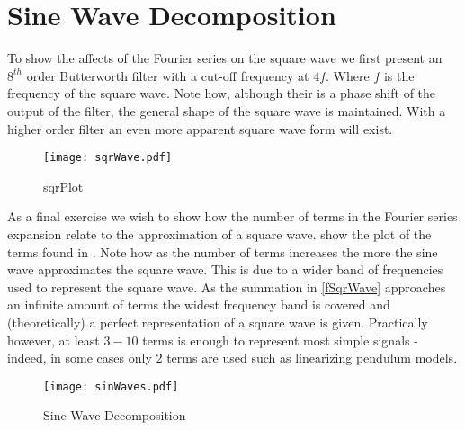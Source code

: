 \documentclass[main.tex]{subfile}
\begin{document}
\section{Sine Wave Decomposition} 
\label{sec:sections}

To show the affects of the Fourier series on the square wave we first present an
$8^{th}$ order Butterworth filter with a cut-off frequency at $4f$. Where $f$
is the frequency of the square wave. Note how, although their is a phase shift
of the output of the filter, the general shape of the square wave is maintained.
With a higher order filter an even more apparent square wave form will exist.

\begin{figure}[H]
    \begin{center}
      \texttt{[image: sqrWave.pdf]}
    \end{center}
    \caption{sqrPlot}
    \label{fig:sqrPlot}
  \end{figure}

As a final exercise we wish to show how the number of terms in the Fourier series
expansion relate to the approximation of a square wave.  show
the plot of the terms found in . Note how as the number of
terms increases the more the sine wave approximates the square wave. This is due
to a wider band of frequencies used to represent the square wave. As the
summation in \eqref{fSqrWave} approaches an infinite amount of terms the widest
frequency band is covered and (theoretically) a perfect representation of a
square wave is given. Practically however, at least $3 - 10$ terms is enough to
represent most simple signals - indeed, in some cases only $2$ terms are used
such as linearizing pendulum models.
 
\begin{figure}[H]
	\begin{center}
		\texttt{[image: sinWaves.pdf]}
	\end{center}
	\caption{Sine Wave Decomposition}
	\label{fig:sinPlot}
\end{figure}

\end{document}
